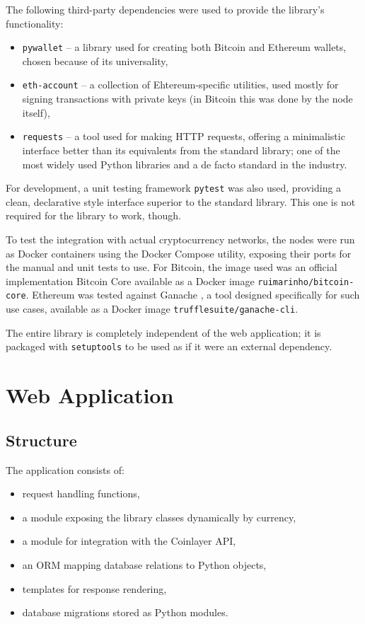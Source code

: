 The following third-party dependencies were used to provide the library's functionality:
\begin{itemize}
    \item \texttt{pywallet} -- a library used for creating both Bitcoin and Ethereum wallets,
    chosen because of its universality,
    \item \texttt{eth-account} -- a collection of Ehtereum-specific utilities,
    used mostly for signing transactions with private keys
    (in Bitcoin this was done by the node itself),
    \item \texttt{requests} -- a tool used for making HTTP requests,
    offering a minimalistic interface better than its equivalents from the standard library;
    one of the most widely used Python libraries and a de facto standard in the industry.
\end{itemize}

For development, a unit testing framework \texttt{pytest} was also used,
providing a clean, declarative style interface superior to the standard library.
This one is not required for the library to work, though.

To test the integration with actual cryptocurrency networks,
the nodes were run as Docker containers using the Docker Compose utility,
exposing their ports for the manual and unit tests to use.
For Bitcoin, the image used was an official implementation Bitcoin Core \cite{bitcoin-core}
available as a Docker image \texttt{ruimarinho/bitcoin-core}.
Ethereum was tested against Ganache \cite{ganache},
a tool designed specifically for such use cases,
available as a Docker image \texttt{trufflesuite/ganache-cli}.

The entire library is completely independent of the web application;
it is packaged with \texttt{setuptools} to be used as if it were an external dependency.

\section{Web Application}

\subsection{Structure}

The application consists of:

\begin{itemize}
    \item request handling functions,
    \item a module exposing the library classes dynamically by currency,
    \item a module for integration with the Coinlayer API,
    \item an ORM mapping database relations to Python objects,
    \item templates for response rendering,
    \item database migrations stored as Python modules.
\end{itemize}

